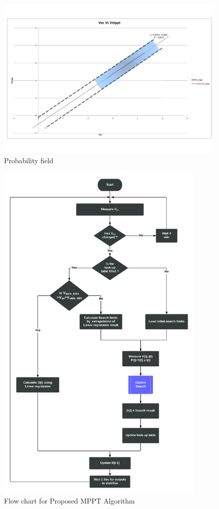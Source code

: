 \cite{liu2011fast}

\begin{figure}[H]
  \begin{center}
	  \includegraphics[width=1.1\textwidth]{images/Probability_field}
	  \caption{Probability field }
	  \label{fig:Probability_field}
  \end{center}
\end{figure}

  \begin{figure}[H]
    \begin{center}
	   \includegraphics[width=0.9\textwidth]{images/Proposed_Flow}
	   \caption{ Flow chart for Proposed MPPT Algorithm }
	   \label{fig:cyflow}
    \end{center}
  \end{figure}






